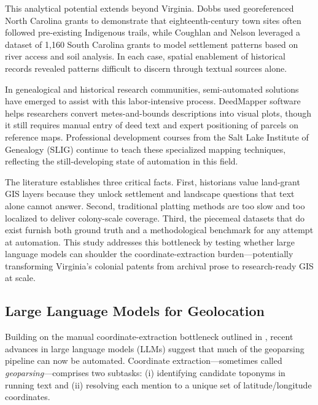 This analytical potential extends beyond Virginia. Dobbs
\citep{Dobbs2009_backcountry} used georeferenced North Carolina grants
to demonstrate that eighteenth-century town sites often followed
pre-existing Indigenous trails, while Coughlan and Nelson
\citep{Coughlan2018_settlement} leveraged a dataset of 1,160 South
Carolina grants to model settlement patterns based on river access and
soil analysis. In each case, spatial enablement of historical records
revealed patterns difficult to discern through textual sources alone.

In genealogical and historical research communities, semi-automated
solutions have emerged to assist with this labor-intensive process.
DeedMapper software \citep{DeedMapper_software} helps researchers
convert metes-and-bounds descriptions into visual plots, though it still
requires manual entry of deed text and expert positioning of parcels on
reference maps. Professional development courses from the Salt Lake
Institute of Genealogy (SLIG) continue to teach these specialized
mapping techniques, reflecting the still-developing state of automation
in this field.

The literature establishes three critical facts. First, historians value
land-grant GIS layers because they unlock settlement and landscape
questions that text alone cannot answer. Second, traditional platting
methods are too slow and too localized to deliver colony-scale coverage.
Third, the piecemeal datasets that do exist furnish both ground truth
and a methodological benchmark for any attempt at automation. This study
addresses this bottleneck by testing whether large language models can
shoulder the coordinate-extraction burden---potentially transforming
Virginia's colonial patents from archival prose to research-ready GIS at
scale.

\subsection{Large Language Models for
Geolocation}\label{large-language-models-for-geolocation}

Building on the manual coordinate-extraction bottleneck outlined in
\DIFdelbegin {}\DIFdelend \DIFaddbegin {}, recent advances in large language models (LLMs) suggest
that much of the geoparsing pipeline can now be automated. Coordinate
extraction---sometimes called \emph{geoparsing}---comprises two
subtasks: (i) identifying candidate toponyms in running text and (ii)
resolving each mention to a unique set of latitude/longitude
coordinates.

